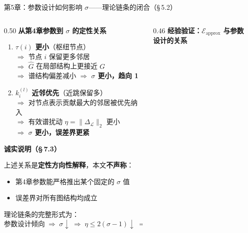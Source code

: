 \documentclass[aspectratio=169,9pt,xcolor=dvipsnames]{beamer}
\newcommand{\highlight}[1]{\textcolor{myred}{\textbf{#1}}}
\newcommand{\blue}[1]{\textcolor{mynavy}{#1}}
\begin{document}
\begin{frame}{第5章：参数设计如何影响 $\sigma$——理论链条的闭合（§\,5.2）}
\begin{columns}[T]

\begin{column}{0.50\textwidth}
  \textbf{\blue{从第4章参数到 $\sigma$ 的定性关系}}

  \begin{enumerate}\setlength{\itemsep}{6pt}
    \item \textbf{$\tau(i)$ 更小}（枢纽节点）\\
      $\Rightarrow$ 节点 $i$ 保留更多邻居\\
      $\Rightarrow$ $\hat{G}$ 在局部结构上更接近 $G$\\
      $\Rightarrow$ 谱结构偏差减小 $\Rightarrow$ \highlight{$\sigma$ 更小，趋向 1}
    \item \textbf{$k_i^{(l)}$ 近邻优先}（近跳保留多）\\
      $\Rightarrow$ 对节点表示贡献最大的邻居被优先纳入\\
      $\Rightarrow$ 有效谱扰动 $\eta=\|\Delta_{\mathcal{L}}\|_2$ 更小\\
      $\Rightarrow$ \highlight{$\sigma$ 更小，误差界更紧}
  \end{enumerate}

  \vspace{0.25cm}
  \textbf{\highlight{诚实说明（§\,7.3）}}

  上述关系是\textbf{定性方向性解释}，本文\textbf{不声称}：
  \begin{itemize}\small\setlength{\itemsep}{2pt}
    \item 第4章参数能严格推出某个固定的 $\sigma$ 值
    \item 误差界对所有图结构均成立
  \end{itemize}
  理论链条的完整形式为：
  \begin{equation*}
    \text{参数设计倾向}
    \;\Rightarrow\;
    \sigma\downarrow
    \;\Rightarrow\;
    \eta\le 2(\sigma-1)\downarrow
    \;\Rightarrow\;
    \text{误差界趋小}
  \end{equation*}
\end{column}

\begin{column}{0.46\textwidth}
  \textbf{\blue{经验验证：$\mathcal{E}_{\mathrm{approx}}$ 与参数设计的关系}}


\end{column}
\end{columns}
\end{frame}
\end{document}
